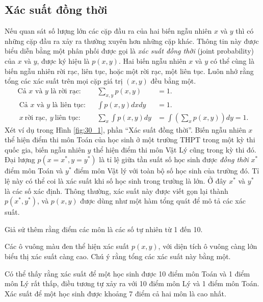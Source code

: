 \subsection{Xác suất đồng thời}
Nếu quan sát số lượng lớn các cặp đầu ra của hai biến ngẫu nhiên $x$ và $y$ thì
có những cặp đầu ra xảy ra thường xuyên hơn những cặp khác. Thông tin này được
biểu diễn bằng một phân phối được gọi là \textit{xác suất đồng thời} (joint probability) của $x$ và
$y$, được ký hiệu là $p(x, y)$. Hai biến ngẫu nhiên $x$ và $y$ có thể cùng là
biến ngẫu nhiên rời rạc, liên tục, hoặc một rời rạc, một liên tục. Luôn nhớ rằng
tổng các xác suất trên mọi cặp giá trị $(x, y)$ đều bằng một.
\begin{align}
\text{Cả $x$ và $y$ là rời rạc:}  & &\sum_{x, y} p(x, y) &= 1. \\\
\text{Cả $x$ và $y$ là liên tục:} & &\int p(x, y) dx dy &=1.\\\
x ~\text{rời rạc}, ~ y ~\text{liên tục:} & &\sum_{x} \int p(x, y) dy &= \int \left(\sum_{x} p(x, y) \right)dy = 1.
\end{align}
Xét ví dụ trong Hình \ref{fig:30_1}, phần ``Xác suất đồng thời''. Biến ngẫu nhiên
$x$ thể hiện điểm thi môn Toán của học sinh ở một trường THPT trong một kỳ thi
quốc gia, biến ngẫu nhiên $y$ thể hiện điểm thi môn Vật Lý cũng trong kỳ thi đó.
Đại lượng $p(x = x^*, y = y^*)$ là tỉ lệ giữa tần suất số học sinh được
\textit{đồng thời} $x^*$ điểm môn Toán và $y^*$ điểm môn Vật lý với
toàn bộ số học sinh của trường đó. Tỉ lệ này có thể coi là xác suất khi số học
sinh trong trường là lớn. Ở đây $x^*$ và $y^*$ là các số xác định. Thông thường,
xác suất này được viết gọn lại thành $p(x^*, y^*)$, và $p(x, y)$ được dùng như
một hàm tổng quát để mô tả các xác suất.

Giả sử thêm rằng điểm các môn là các số tự nhiên từ 1 đến 10.

Các ô vuông màu đen thể hiện xác suất $p(x, y)$, với diện tích ô vuông càng lớn
biểu thị xác suất càng cao. Chú ý rằng tổng các xác suất này bằng một.

{Có thể thấy rằng xác suất để một học sinh được 10 điểm môn Toán
và 1 điểm môn Lý rất thấp, điều tương tự xảy ra với 10 điểm môn Lý và 1 điểm môn
Toán. Xác suất để một học sinh được khoảng 7 điểm cả hai môn là cao
nhất.}

